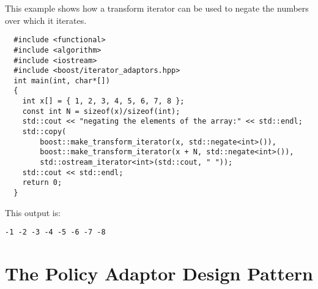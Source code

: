 \documentclass{netobjectdays}
\begin{document}
This example shows how a transform iterator can be used to negate the
numbers over which it iterates.

{\footnotesize
\begin{verbatim}
  #include <functional>
  #include <algorithm>
  #include <iostream>
  #include <boost/iterator_adaptors.hpp>
  int main(int, char*[])
  {
    int x[] = { 1, 2, 3, 4, 5, 6, 7, 8 };
    const int N = sizeof(x)/sizeof(int);
    std::cout << "negating the elements of the array:" << std::endl;
    std::copy(
        boost::make_transform_iterator(x, std::negate<int>()),
        boost::make_transform_iterator(x + N, std::negate<int>()),
        std::ostream_iterator<int>(std::cout, " "));
    std::cout << std::endl;
    return 0;
  }
\end{verbatim}
}

\noindent This output is: 
{\footnotesize
\begin{verbatim}
-1 -2 -3 -4 -5 -6 -7 -8
\end{verbatim}
}

\section{The Policy Adaptor Design Pattern}
\end{document}
